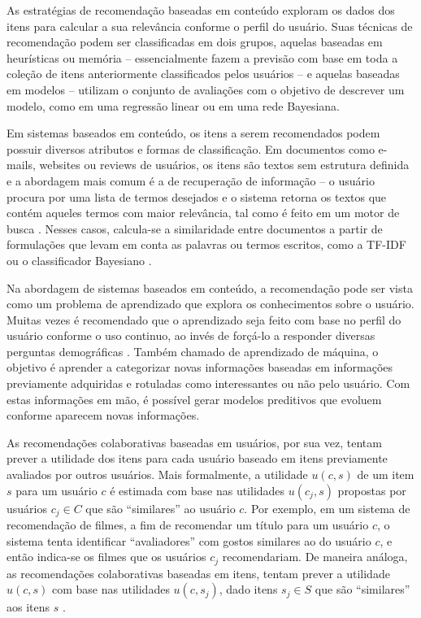 As estratégias de recomendação baseadas em conteúdo exploram os dados dos itens para calcular a sua relevância conforme o perfil do usuário. Suas técnicas de recomendação podem ser classificadas em dois grupos, aquelas baseadas em heurísticas ou memória -- essencialmente fazem a previsão com base em toda a coleção de itens anteriormente classificados pelos usuários -- e aquelas baseadas em modelos -- utilizam o conjunto de avaliações com o objetivo de descrever um modelo, como em uma regressão linear ou em uma rede Bayesiana. 

Em sistemas baseados em conteúdo, os itens a serem recomendados podem possuir diversos atributos e formas de classificação. Em documentos como e-mails, websites ou reviews de usuários, os itens são textos sem estrutura definida e a abordagem mais comum é a de recuperação de informação -- o usuário procura por uma lista de termos desejados e o sistema retorna os textos que contém aqueles termos com maior relevância, tal como é feito em um motor de busca \cite{schafer2001commerce}. Nesses casos, calcula-se a similaridade entre documentos a partir de formulações que levam em conta as palavras ou termos escritos, como a TF-IDF ou o classificador Bayesiano \cite{lops2011content-chap3}. 

Na abordagem de sistemas baseados em conteúdo, a recomendação pode ser vista como um problema de aprendizado que explora os conhecimentos sobre o usuário. Muitas vezes é recomendado que o aprendizado seja feito com base no perfil do usuário conforme o uso continuo, ao invés de forçá-lo a responder diversas perguntas demográficas \cite{wei2007survey}. Também chamado de aprendizado de máquina, o objetivo é aprender a categorizar novas informações baseadas em informações previamente adquiridas e rotuladas como interessantes ou não pelo usuário. Com estas informações em mão, é possível gerar modelos preditivos que evoluem conforme aparecem novas informações.

As recomendações colaborativas baseadas em usuários, por sua vez, tentam prever a utilidade dos itens para cada usuário baseado em itens previamente avaliados por outros usuários. Mais formalmente, a utilidade $u(c,s)$ de um item $s$ para um usuário $c$ é estimada com base nas utilidades $u(c_j,s)$ propostas por usuários $c_j \in C$ que são ``similares'' ao usuário $c$. Por exemplo, em um sistema de recomendação de filmes, a fim de recomendar um título para um usuário $c$, o sistema tenta identificar ``avaliadores'' com gostos similares ao do usuário $c$, e então indica-se os filmes que os usuários $c_j$ recomendariam. De maneira análoga, as recomendações colaborativas baseadas em itens, tentam prever a utilidade $u(c,s)$ com base nas utilidades $u(c,s_j)$, dado itens $s_j \in S$ que são ``similares'' aos itens $s$ \cite{linden2003amazon}.

